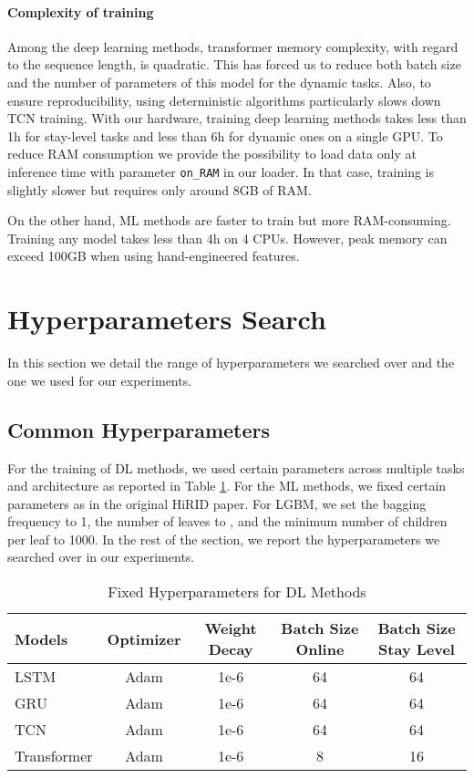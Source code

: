 \documentclass{article}
\begin{document}
\paragraph{Complexity of training}
Among the deep learning methods, transformer memory complexity, with regard to the sequence length, is quadratic. This has forced us to reduce both batch size and the number of parameters of this model for the dynamic tasks. Also, to ensure reproducibility, using deterministic algorithms particularly slows down TCN training. With our hardware, training deep learning methods takes less than 1h for stay-level tasks and less than 6h for dynamic ones on a single GPU.
To reduce RAM consumption we provide the possibility to load data only at inference time with parameter \texttt{on\_RAM} in our loader. In that case, training is slightly slower but requires only around 8GB of RAM.

On the other hand, ML methods are faster to train but more RAM-consuming. Training any model takes less than 4h on 4 CPUs. However, peak memory can exceed 100GB when using hand-engineered features.

\section*{Hyperparameters Search}\label{appsec:hyper-parameters}
In this section we detail the range of hyperparameters we searched over and the one we used for our experiments.
\subsection*{Common Hyperparameters}
For the training of DL methods, we used certain parameters across multiple tasks and architecture as reported in Table \ref{tab:fixed-hp-dl}.
For the ML methods, we fixed certain parameters as in the original HiRID paper. For LGBM, we set the bagging frequency to 1,
the number of leaves to ,  and the minimum number of children per leaf to 1000. In the rest of the section, we report the hyperparameters we searched over in our experiments.

\begin{table}[tbh!]
    \centering
    \begin{tabular}{l|c|c|c|c}
        \toprule
        Models & Optimizer  & Weight Decay & Batch Size Online & Batch Size Stay Level  \\
        \midrule
        LSTM & Adam  & 1e-6 & 64  & 64 \\ 
        GRU & Adam  & 1e-6 & 64  & 64 \\
        TCN & Adam  & 1e-6 & 64   & 64\\ 
        Transformer & Adam  & 1e-6 & 8   & 16 \\
        \bottomrule
        \end{tabular}
    \caption{Fixed Hyperparameters for DL Methods }
    \label{tab:fixed-hp-dl}
\end{table}
\end{document}
